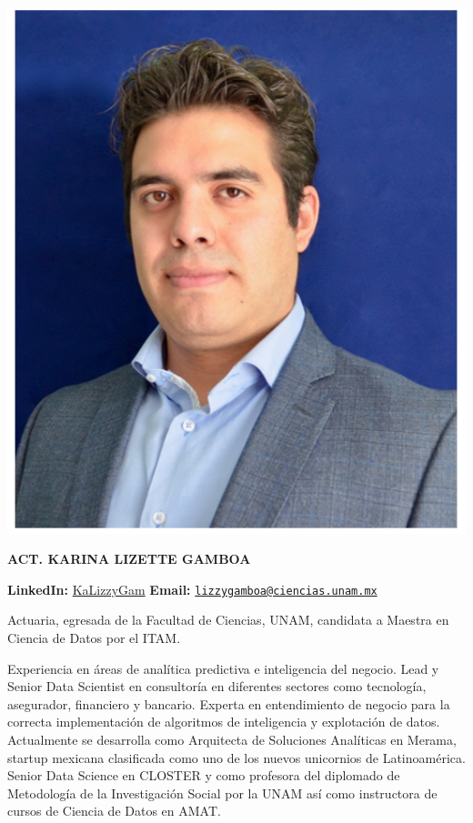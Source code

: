\documentclass[
]{book}
\begin{document}
\begin{center}\includegraphics[width=6.57in]{img/00-presentacion/arturo} \end{center}

\textbf{ACT. KARINA LIZETTE GAMBOA}

\textbf{LinkedIn:} \href{https://www.linkedin.com/in/kalizzygam/}{KaLizzyGam}
\textbf{Email:} \href{mailto:lizzygamboa@ciencias.unam.mx}{\nolinkurl{lizzygamboa@ciencias.unam.mx}}

Actuaria, egresada de la Facultad de Ciencias, UNAM, candidata a Maestra en
Ciencia de Datos por el ITAM.

Experiencia en áreas de analítica predictiva e inteligencia del negocio. Lead y Senior
Data Scientist en consultoría en diferentes sectores como tecnología, asegurador,
financiero y bancario. Experta en entendimiento de negocio para la correcta
implementación de algoritmos de inteligencia y explotación de datos.
Actualmente se desarrolla como Arquitecta de Soluciones Analíticas en Merama,
startup mexicana clasificada como uno de los nuevos unicornios de Latinoamérica.
Senior Data Science en CLOSTER y como profesora del diplomado de Metodología
de la Investigación Social por la UNAM así como instructora de cursos de Ciencia de
Datos en AMAT.
\end{document}
